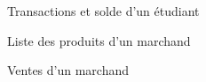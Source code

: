 		\begin{figure}[p]
			\caption{Transactions et solde d’un étudiant}
			\label{fig.transEtudiant}
		\end{figure}
		
		\begin{figure}[p]
			\caption{Liste des produits d’un marchand}
			\label{fig.prodMarchands}
		\end{figure}

		\begin{figure}[p]
			\caption{Ventes d’un marchand}
			\label{fig.ventesMarchands}
		\end{figure}

